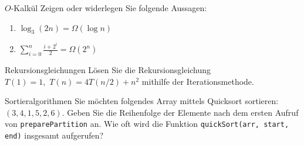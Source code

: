 \documentclass[11pt,a4paper]{article}
\begin{document}
\begin{aufgabe}{2}{$O$-Kalkül}
    Zeigen oder widerlegen Sie folgende Aussagen:
    \begin{enumerate}
        \item $\log_3(2n) = \Omega(\log n)$
        \item $\sum\limits_{i=0}^n \frac{i + 2^i}{2} = \Omega(2^n)$
    \end{enumerate}
\end{aufgabe}
\begin{aufgabe}{3}{Rekursionsgleichungen}
        Lösen Sie die Rekursionsgleichung $T(1) = 1, \,\, T(n) = 4T(n / 2) + n^2$ mithilfe der Iterationsmethode.
\end{aufgabe}
\begin{aufgabe}{4}{Sortieralgorithmen}
        Sie möchten folgendes Array mittels Quicksort sortieren: $(3, 4, 1, 5, 2, 6)$.
        Geben Sie die Reihenfolge der Elemente nach dem ersten Aufruf von \texttt{preparePartition} an.
        Wie oft wird die Funktion \texttt{quickSort(arr, start, end)} insgesamt aufgerufen?
\end{aufgabe}
\end{document}
